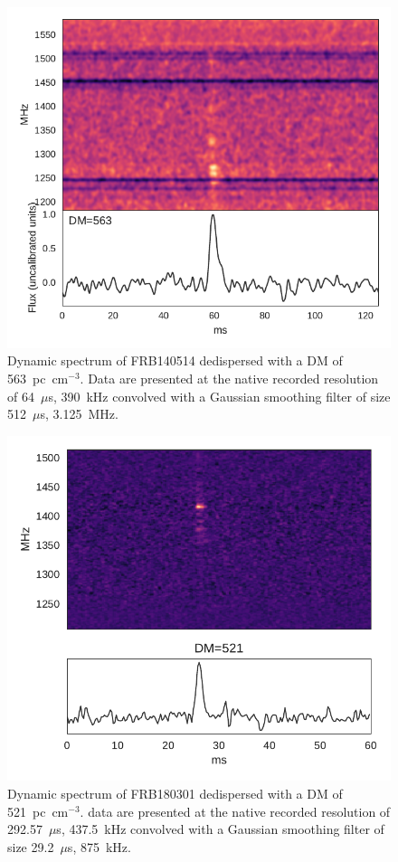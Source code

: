 \documentclass[a4paper,fleqn,usenatbib]{mnras}
\begin{document}
\begin{figure}
    \includegraphics[width=1.0\linewidth]{figures/FRB140514.pdf}
    \caption{Dynamic spectrum of FRB140514 dedispersed with a DM of
    563~pc~cm$^{-3}$.  Data are presented at the native recorded resolution of
    64~$\mu$s, 390~kHz convolved with a Gaussian smoothing filter of size
    512~$\mu$s, 3.125~MHz.
    }
    \label{fig:FRB140514}
\end{figure}

\begin{figure}
    \includegraphics[width=1.0\linewidth]{figures/FRB180301.pdf}
    \caption{Dynamic spectrum of FRB180301 dedispersed with a DM of
    521~pc~cm$^{-3}$.  data are presented at the native recorded resolution of
    292.57~$\mu$s, 437.5~kHz convolved with a Gaussian smoothing filter of size
    29.2~$\mu$s, 875~kHz.
    }
    \label{fig:FRB180301}
\end{figure}
\end{document}
